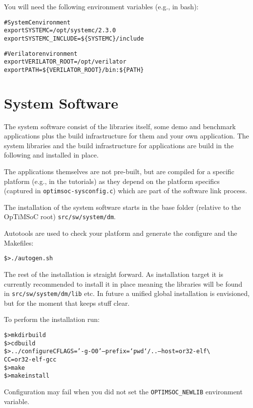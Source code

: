 You will need the following environment variables (e.g., in bash):

\begin{alltt}
# SystemC environment
export SYSTEMC=/opt/systemc/2.3.0
export SYSTEMC_INCLUDE=\$\{SYSTEMC\}/include

# Verilator environment
export VERILATOR\_ROOT=/opt/verilator
export PATH=\$\{VERILATOR_ROOT\}/bin:\$\{PATH\}
\end{alltt}

\section{System Software}

The system software consist of the libraries itself, some demo and
benchmark applications plus the build infrastructure for them and your
own application. The system libraries and the build infrastructure for
applications are build in the following and installed in place.

The applications themselves are not pre-built, but are compiled for a
specific platform (e.g., in the tutorials) as they depend on the
platform specifics (captured in \verb|optimsoc-sysconfig.c|) which are
part of the software link process.

The installation of the system software starts in the base folder
(relative to the OpTiMSoC root) \verb|src/sw/system/dm|.

Autotools are used to check your platform and generate the configure
and the Makefiles:

\begin{alltt}
\$> ./autogen.sh
\end{alltt}

The rest of the installation is straight forward. As installation
target it is currently recommended to install it in place meaning the
libraries will be found in \verb|src/sw/system/dm/lib| etc. In future
a unified global installation is envisioned, but for the moment that
keeps stuff clear.

To perform the installation run:

\begin{alltt}
\$> mkdir build
\$> cd build
\$> ../configure CFLAGS='-g -O0' --prefix=`pwd`/.. --host=or32-elf \textbackslash
    CC=or32-elf-gcc
\$> make
\$> make install
\end{alltt}

Configuration may fail when you did not set the \verb|OPTIMSOC_NEWLIB|
environment variable.

